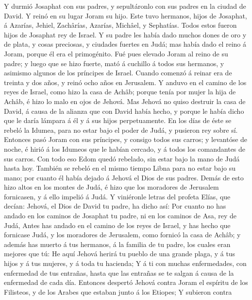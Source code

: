  Y durmió Josaphat con sus padres, y sepultáronlo con sus
padres en la ciudad de David. Y reinó en su lugar Joram su hijo.
 Este tuvo hermanos, hijos de Josaphat, á Azarías, Jehiel,
Zachârías, Azarías, Michâel, y Sephatías. Todos estos fueron hijos de
Josaphat rey de Israel.  Y su padre les había dado muchos
dones de oro y de plata, y cosas preciosas, y ciudades fuertes en Judá;
mas había dado el reino á Joram, porque él era el primogénito.
 Fué pues elevado Joram al reino de su padre; y luego que se
hizo fuerte, mató á cuchillo á todos sus hermanos, y asimismo algunos de
los príncipes de Israel.  Cuando comenzó á reinar era de
treinta y dos años, y reinó ocho años en Jerusalem.  Y
anduvo en el camino de los reyes de Israel, como hizo la casa de Achâb;
porque tenía por mujer la hija de Achâb, é hizo lo malo en ojos de
Jehová.  Mas Jehová no quiso destruir la casa de David, á
causa de la alianza que con David había hecho, y porque le había dicho
que le daría lámpara á él y á sus hijos perpetuamente.  En
los días de éste se rebeló la Idumea, para no estar bajo el poder de
Judá, y pusieron rey sobre sí.  Entonces pasó Joram con sus
príncipes, y consigo todos sus carros; y levantóse de noche, é hirió á
los Idumeos que le habían cercado, y á todos los comandantes de sus
carros.  Con todo eso Edom quedó rebelado, sin estar bajo
la mano de Judá hasta hoy. También se rebeló en el mismo tiempo Libna
para no estar bajo su mano; por cuanto él había dejado á Jehová el Dios
de sus padres.  Demás de esto hizo altos en los montes de
Judá, é hizo que los moradores de Jerusalem fornicasen, y á ello impelió
á Judá.  Y viniéronle letras del profeta Elías, que decían:
Jehová, el Dios de David tu padre, ha dicho así: Por cuanto no has
andado en los caminos de Josaphat tu padre, ni en los caminos de Asa,
rey de Judá,  Antes has andado en el camino de los reyes de
Israel, y has hecho que fornicase Judá, y los moradores de Jerusalem,
como fornicó la casa de Achâb; y además has muerto á tus hermanos, á la
familia de tu padre, los cuales eran mejores que tú:  He
aquí Jehová herirá tu pueblo de una grande plaga, y á tus hijos y á tus
mujeres, y á toda tu hacienda;  Y á ti con muchas
enfermedades, con enfermedad de tus entrañas, hasta que las entrañas se
te salgan á causa de la enfermedad de cada día.  Entonces
despertó Jehová contra Joram el espíritu de los Filisteos, y de los
Arabes que estaban junto á los Etiopes;  Y subieron contra
